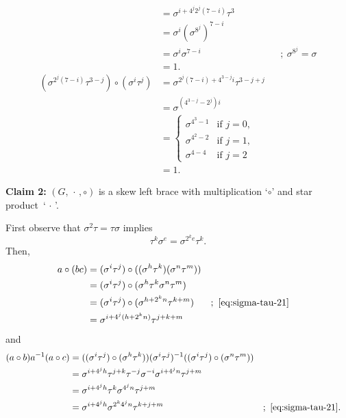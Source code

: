 \begin{xmpls}
\begin{enumerate}[a),font=\upshape]
\begin{enumerate}[-]
\begin{align*}
                    &= \sigma^{i+4^j2^j(7-i)}\tau^3\\
                    &= \sigma^i(\sigma^{8^j})^{7-i}\\
                    &= \sigma^i\sigma^{7-i} &&;\ \sigma^{8^j}=\sigma\\
                    &= 1.\\
                (\sigma^{2^j(7-i)}\tau^{3-j})\circ(\sigma^i\tau^j)
                    &= \sigma^{2^j(7-i)+4^{3-j}i}\tau^{3-j+j}\\
                    &= \sigma^{(4^{3-j}-2^j)i}\\
                    &= \begin{cases}
                        \sigma^{4^3-1}   &\text{if }j=0,\\
                        \sigma^{4^2-2}  &\text{if }j=1,\\
                        \sigma^{4-4}    &\text{if }j=2
                    \end{cases}\\
                    &= 1.
            \end{align*}
    \end{enumerate}
    \textbf{Claim 2:} $(G,\,\cdot\,,\circ)$ is a skew left brace with multiplication `$\circ$' and star product~`$\,\cdot\,$'.
    
    First observe that $\sigma^2\tau=\tau\sigma$ implies
    \begin{equation}\label{eq:sigma-tau-21}
        \tau^k\sigma^e=\sigma^{2^ke}\tau^k.
    \end{equation}
    Then,
    \begin{align*}
        a\circ(bc) &= (\sigma^i\tau^j)
                \circ((\sigma^h\tau^k)(\sigma^n\tau^m))\\
            &= (\sigma^i\tau^j)\circ(\sigma^h\tau^k\sigma^n\tau^m)\\
            &= (\sigma^i\tau^j)\circ(\sigma^{h+2^kn}\tau^{k+m})
                    &&;\ \eqref{eq:sigma-tau-21}\\
            &= \sigma^{i+4^j(h+2^kn)}\tau^{j+k+m}
    \end{align*}
    and
    \begin{align*}
        (a\circ b)a^{-1}(a\circ c) &=
        ((\sigma^i\tau^j)\circ(\sigma^h\tau^k))(\sigma^i\tau^j)^{-1}
            ((\sigma^i\tau^j)\circ(\sigma^n\tau^m))\\
            &= \sigma^{i+4^jh}\tau^{j+k}\tau^{-j}\sigma^{-i}\sigma^{i+4^jn}
                \tau^{j+m}\\
            &= \sigma^{i+4^jh}\tau^k\sigma^{4^jn}\tau^{j+m}\\
            &= \sigma^{i+4^jh}\sigma^{2^k4^jn}\tau^{k+j+m}
                    &&;\ \eqref{eq:sigma-tau-21}.
    \end{align*}


\end{enumerate}
\end{xmpls}
